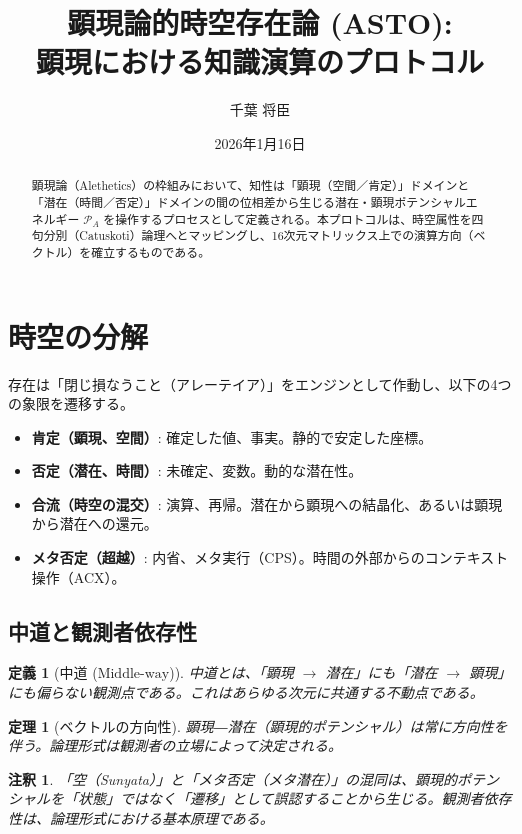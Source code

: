 \documentclass[12pt,a4paper]{ujarticle}
\title{顕現論的時空存在論 (ASTO):\\
顕現における知識演算のプロトコル}
\author{千葉 将臣}
\date{2026年1月16日}
\newtheorem{definition}{定義}[section]
\newtheorem{theorem}{定理}[section]
\newtheorem*{note}{注釈}
\newcommand{\powa}{\mathcal{P}_A}    %
\newcommand{\middleway}{\text{Middle-way}} %
\begin{document}
\maketitle

\begin{abstract}
顕現論（Alethetics）の枠組みにおいて、知性は「顕現（空間／肯定）」ドメインと「潜在（時間／否定）」ドメインの間の位相差から生じる潜在・顕現ポテンシャルエネルギー $\powa$ を操作するプロセスとして定義される。本プロトコルは、時空属性を四句分別（Catuskoti）論理へとマッピングし、16次元マトリックス上での演算方向（ベクトル）を確立するものである。
\end{abstract}

\section{時空の分解}

存在は「閉じ損なうこと（アレーテイア）」をエンジンとして作動し、以下の4つの象限を遷移する。

\begin{itemize}
    \item \textbf{肯定（顕現、空間）}: 確定した値、事実。静的で安定した座標。
    \item \textbf{否定（潜在、時間）}: 未確定、変数。動的な潜在性。
    \item \textbf{合流（時空の混交）}: 演算、再帰。潜在から顕現への結晶化、あるいは顕現から潜在への還元。
    \item \textbf{メタ否定（超越）}: 内省、メタ実行（CPS）。時間の外部からのコンテキスト操作（ACX）。
\end{itemize}

\subsection{中道と観測者依存性}

\begin{definition}[中道 ($\middleway$)]
中道とは、「顕現 $\to$ 潜在」にも「潜在 $\to$ 顕現」にも偏らない観測点である。これはあらゆる次元に共通する不動点である。
\end{definition}

\begin{theorem}[ベクトルの方向性]
顕現―潜在（顕現的ポテンシャル）は常に方向性を伴う。論理形式は観測者の立場によって決定される。
\end{theorem}

\begin{note}
「空（Sunyata）」と「メタ否定（メタ潜在）」の混同は、顕現的ポテンシャルを「状態」ではなく「遷移」として誤認することから生じる。観測者依存性は、論理形式における基本原理である。
\end{note}
\end{document}
